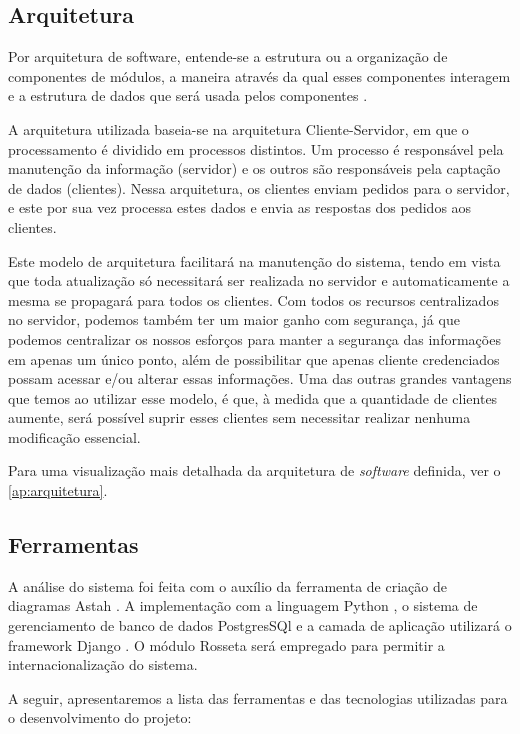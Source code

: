 \subsection{Arquitetura}
Por arquitetura de software, entende-se a estrutura ou a organização de componentes de módulos, a maneira através da qual esses componentes interagem e a estrutura de dados que será usada pelos componentes \cite{pressman2006engenharia}.

A arquitetura utilizada baseia-se na arquitetura Cliente-Servidor\cite{david2013everything}, em que o processamento é dividido em processos distintos. Um processo é responsável pela manutenção da 
informação (servidor) e os outros são responsáveis pela captação de dados (clientes). Nessa arquitetura, os clientes enviam pedidos para o servidor, e este por sua vez processa estes dados e envia as 
respostas dos pedidos aos clientes.

Este modelo de arquitetura facilitará na manutenção do sistema, tendo em vista que toda atualização só necessitará ser realizada no servidor e automaticamente a mesma se propagará para todos os 
clientes. Com todos os recursos centralizados no servidor, podemos também ter um maior ganho com segurança, já que podemos centralizar os nossos esforços para manter a segurança das informações em 
apenas um único ponto, além de possibilitar que apenas cliente credenciados possam acessar e/ou alterar essas informações. Uma das outras grandes vantagens que temos  ao utilizar esse modelo, é que, 
\`a medida que a quantidade de clientes aumente, será possível suprir esses clientes sem necessitar realizar nenhuma modificação essencial.

Para uma visualização mais detalhada da arquitetura de \textit{software} definida, ver o  \autoref{ap:arquitetura}.

\subsection{Ferramentas}

A análise do sistema foi feita com o auxílio da ferramenta de criação de diagramas Astah \cite{astah2016}. A implementação com a linguagem 
Python \cite{vanrossum2010python}, o sistema de gerenciamento de banco de dados PostgresSQl \cite{momjian2001postgresql} e a camada de 
aplicação utilizar\'a o framework Django \cite{django2016}. O módulo Rosseta \cite{rosetta2016} ser\'a empregado 
para permitir a internacionalização do sistema.
 
A seguir, apresentaremos a lista das ferramentas e das tecnologias utilizadas para o desenvolvimento do projeto:

